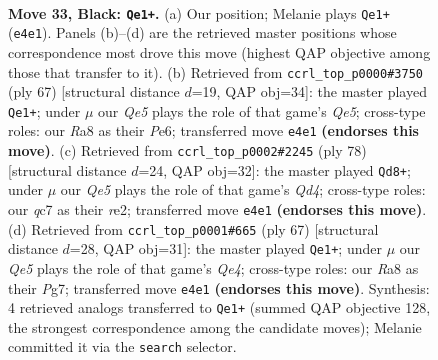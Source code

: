 \documentclass[11pt]{article}
\begin{document}
\clearpage

\begin{figure}[p]\centering
\begin{subfigure}{0.46\textwidth}\centering
\resizebox{\linewidth}{!}{%
\newchessgame
\chessboard[
  setfen={r7/2Q4p/3pkp2/8/pP2q3/6P1/P4P1P/6K1 b - - 2 33},
  showmover=false,
  pgfstyle=straightmove, color=movearrow, markmove={e4-e1}
]}
\caption{}
\end{subfigure}\hfill
\begin{subfigure}{0.46\textwidth}\centering
\resizebox{\linewidth}{!}{%
\newchessgame
\chessboard[
  setfen={8/Q4ppk/1p2p3/7p/1P2q3/6P1/P4P1P/6K1 b - - 4 34},
  showmover=false,
  pgfstyle=straightmove, color=movearrow, markmove={e4-e1}
]}
\caption{}
\end{subfigure}
\\[4pt]
\begin{subfigure}{0.46\textwidth}\centering
\resizebox{\linewidth}{!}{%
\newchessgame
\chessboard[
  setfen={6k1/5p2/p5p1/7p/1P1Q4/q5PP/4rP2/5RK1 w - - 0 40},
  showmover=false,
  pgfstyle=straightmove, color=movearrow, markmove={d4-d8}
]}
\caption{}
\end{subfigure}\hfill
\begin{subfigure}{0.46\textwidth}\centering
\resizebox{\linewidth}{!}{%
\newchessgame
\chessboard[
  setfen={4k3/6p1/Q3p2p/p3q3/8/5P1P/1PP3P1/7K b - - 0 34},
  showmover=false,
  pgfstyle=straightmove, color=movearrow, markmove={e5-e1}
]}
\caption{}
\end{subfigure}
\caption{\textbf{Move 33, Black: \texttt{Qe1+}.} (a) Our position; Melanie plays \texttt{Qe1+} (\texttt{e4e1}). Panels (b)--(d) are the retrieved master positions whose correspondence most drove this move (highest QAP objective among those that transfer to it). (b) Retrieved from \texttt{ccrl\_top\_p0000\#3750} (ply 67) [structural distance $d$=19, QAP obj=34]: the master played \texttt{Qe1+}; under $\mu$ our \emph{Qe5} plays the role of that game's \emph{Qe5}; cross-type roles: our \emph{R}a8 as their \emph{P}e6; transferred move \texttt{e4e1} \textbf{(endorses this move)}. (c) Retrieved from \texttt{ccrl\_top\_p0002\#2245} (ply 78) [structural distance $d$=24, QAP obj=32]: the master played \texttt{Qd8+}; under $\mu$ our \emph{Qe5} plays the role of that game's \emph{Qd4}; cross-type roles: our \emph{q}c7 as their \emph{r}e2; transferred move \texttt{e4e1} \textbf{(endorses this move)}. (d) Retrieved from \texttt{ccrl\_top\_p0001\#665} (ply 67) [structural distance $d$=28, QAP obj=31]: the master played \texttt{Qe1+}; under $\mu$ our \emph{Qe5} plays the role of that game's \emph{Qe4}; cross-type roles: our \emph{R}a8 as their \emph{P}g7; transferred move \texttt{e4e1} \textbf{(endorses this move)}. Synthesis: 4 retrieved analogs transferred to \texttt{Qe1+} (summed QAP objective 128, the strongest correspondence among the candidate moves); Melanie committed it via the \texttt{search} selector.}
\label{fig:thought-m65}
\end{figure}
\end{document}

